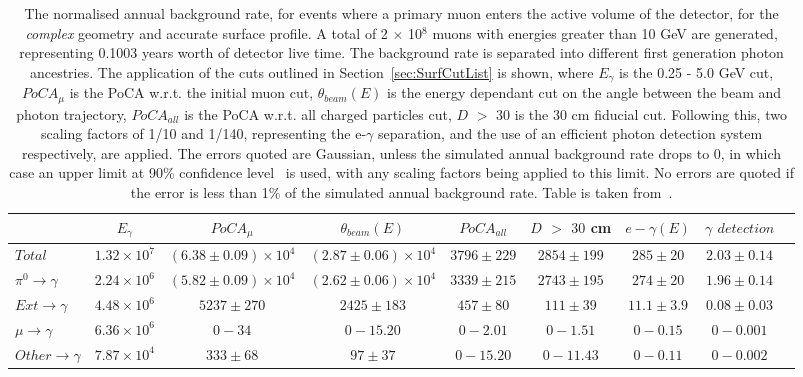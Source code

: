 \begin{table}
  \caption[The normalised annual background rate, for events where a primary muon enters the active volume of the detector, for the \emph{complex} geometry and accurate surface profile]
          {The normalised annual background rate, for events where a primary muon enters the active volume of the detector, for the \emph{complex} geometry and accurate surface profile. A total of 2 $\times$ 10$^8$ muons with energies greater than 10 GeV are generated, representing 0.1003 years worth of detector live time. The background rate is separated into different first generation photon ancestries. The application of the cuts outlined in Section~\ref{sec:SurfCutList} is shown, where $E_\gamma$ is the 0.25 - 5.0 GeV cut, $PoCA_\mu$ is the PoCA w.r.t. the initial muon cut, $\theta_{beam}(E)$ is the energy dependant cut on the angle between the beam and photon trajectory, $PoCA_{all}$ is the PoCA w.r.t. all charged particles cut, $D$ $>$ $30$ is the 30 cm fiducial cut. Following this, two scaling factors of 1/10 and 1/140, representing the e-$\gamma$ separation, and the use of an efficient photon detection system respectively, are applied. The errors quoted are Gaussian, unless the simulated annual background rate drops to 0, in which case an upper limit at 90\% confidence level~\citep{PhysRevD.57.3873} is used, with any scaling factors being applied to this limit. No errors are quoted if the error is less than 1\% of the simulated annual background rate. Table is taken from~\citep{MartinsThesis}.}
  \label{tab:SurfMuComp}
  \centering
  \scriptsize
  \begin{tabular}{l c c c c c c c c }
    \toprule
        & $E_\gamma$ & $PoCA_\mu$ & $\theta_{beam}(E)$ & $PoCA_{all}$ & $D$ $>$ $30$ cm & $e-\gamma(E)$ & $\gamma$ $detection$ \\
        \midrule
        $Total$          & $1.32\times10^7$ & $(6.38\pm0.09)\times10^4$ & $(2.87\pm0.06)\times10^4$ & $3796\pm229$ & $2854\pm199$ & $285\pm20$   & $2.03\pm0.14$ \\

        $\pi^0\to\gamma$ & $2.24\times10^6$ & $(5.82\pm0.09)\times10^4$ & $(2.62\pm0.06)\times10^4$ & $3339\pm215$ & $2743\pm195$ & $274\pm20$   & $1.96\pm0.14$ \\

        $Ext\to\gamma$   & $4.48\times10^6$ & $5237\pm270$              & $2425\pm183$              & $457\pm80$   & $111\pm39$   & $11.1\pm3.9$ & $0.08\pm0.03$ \\

        $\mu\to\gamma$   & $6.36\times10^6$ & $0-34$                    & $0-15.20$                 & $0-2.01$     & $0-1.51$     & $0-0.15$     & $0-0.001$ \\

        $Other\to\gamma$ & $7.87\times10^4$ & $333\pm68$                & $97\pm37$                 & $0-15.20$    & $0-11.43$    & $0-0.11$     & $0-0.002$ \\
        \bottomrule
  \end{tabular}
\end{table}

